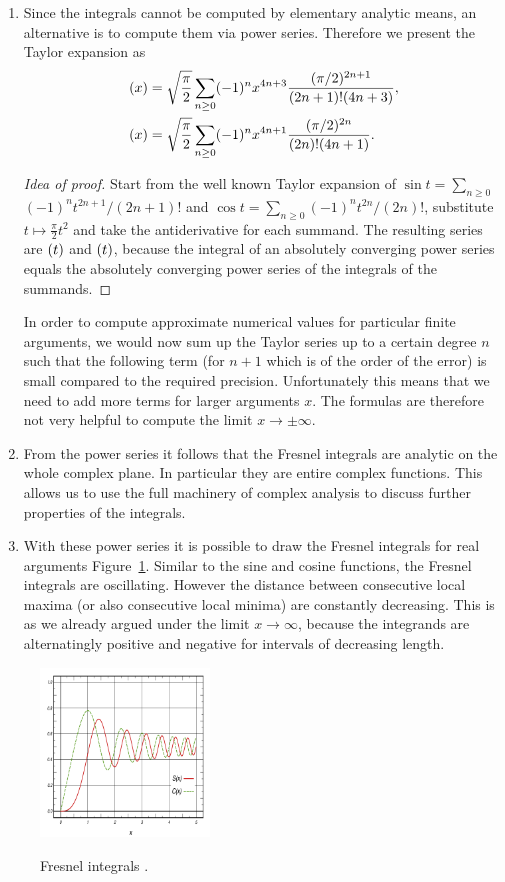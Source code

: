 \documentclass[12pt]{article}
\let\C=\relax
\DeclareMathOperator\C{C} %
\def\d#1{{\,\ud#1\,}}
\let\S=\relax
\DeclareMathOperator\S{S} %
\begin{document}
\begin{enumerate}
\item Since the integrals cannot be computed by elementary analytic means, an alternative is to compute them via power series.  Therefore we present the Taylor expansion as
\begin{align*}
  \S(x) &= \sqrt{\frac\pi2}\sum_{n\ge0} (-1)^nx^{4n+3}\frac{(\pi/2)^{2n+1}}{(2n+1)!(4n+3)}, \\
  \C(x) &= \sqrt{\frac\pi2}\sum_{n\ge0} (-1)^nx^{4n+1}\frac{(\pi/2)^{2n}}{(2n)!(4n+1)}.
\end{align*}
\begin{proof}[Idea of proof]  Start from the well known Taylor expansion of $\sin t = \sum_{n\ge0}$ $(-1)^n t^{2n+1}/(2n+1)!$ and $\cos t = \sum_{n\ge0} (-1)^nt^{2n}/(2n)!$, substitute $t\mapsto \tfrac\pi2 t^2$ and take the antiderivative for each summand.  The resulting series are $\S(t)$ and $\C(t)$, because the integral of an absolutely converging power series equals the absolutely converging power series of the integrals of the summands.
\end{proof}
In order to compute approximate numerical values for particular finite arguments, we would now sum up the Taylor series up to a certain degree $n$ such that the following term (for $n+1$ which is of the order of the error) is small compared to the required precision.  Unfortunately this means that we need to add more terms for larger arguments $x$.  The formulas are therefore not very helpful to compute the limit $x\to\pm\infty$.

\item From the power series it follows that the Fresnel integrals are analytic on the whole complex plane.  In particular they are entire complex functions.  This allows us to use the full machinery of complex analysis to discuss further properties of the integrals.

\item With these power series it is possible to draw the Fresnel integrals for real arguments Figure~\ref{f:graphFresnelIntegrals}.  Similar to the sine and cosine functions, the Fresnel integrals are oscillating.  However the distance between consecutive local maxima (or also consecutive local minima) are constantly decreasing.  This is as we already argued under the limit $x\to\infty$, because the integrands are alternatingly positive and negative for intervals of decreasing length.
\end{enumerate}
\begin{figure}[h!]
	\centering
	\includegraphics[width=0.4\textwidth]{Fresnel-Integrals-(Normalised).png}
	\label{f:graphFresnelIntegrals}
	\caption{Fresnel integrals \cite{wiki}.}
\end{figure}
\end{document}
